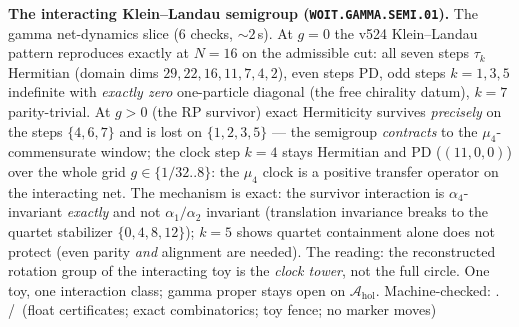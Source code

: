 \documentclass[11pt,a4paper]{article}
\theoremstyle{definition}
\begin{document}
\par\smallskip\noindent\textbf{The interacting Klein--Landau
semigroup (\texttt{WOIT.GAMMA.SEMI.01}).}
The gamma net-dynamics slice ($6$ checks, ${\sim}2$\,s).  At $g=0$
the v524 Klein--Landau pattern reproduces exactly at $N=16$ on the
admissible cut: all seven steps $\tau_k$ Hermitian (domain dims
$29,22,16,11,7,4,2$), even steps PD, odd steps $k=1,3,5$ indefinite
with \emph{exactly zero} one-particle diagonal (the free chirality
datum), $k=7$ parity-trivial.  At $g>0$ (the RP survivor) exact
Hermiticity survives \emph{precisely} on the steps $\{4,6,7\}$ and
is lost on $\{1,2,3,5\}$ --- the semigroup \emph{contracts} to the
$\mu_4$-commensurate window; the clock step $k=4$ stays Hermitian
and PD ($(11,0,0)$) over the whole grid $g\in\{1/32..8\}$: the
$\mu_4$ clock is a positive transfer operator on the interacting
net.  The mechanism is exact: the survivor interaction is
$\alpha_4$-invariant \emph{exactly} and not $\alpha_1/\alpha_2$
invariant (translation invariance breaks to the quartet stabilizer
$\{0,4,8,12\}$); $k=5$ shows quartet containment alone does not
protect (even parity \emph{and} alignment are needed).  The reading:
the reconstructed rotation group of the interacting toy is the
\emph{clock tower}, not the full circle.  One toy, one interaction
class; gamma proper stays open on $\mathcal A_{\mathrm{hol}}$.
Machine-checked: .
\mE/\mC\ (float certificates; exact combinatorics; toy fence;
no marker moves)
\par\smallskip
\end{document}

